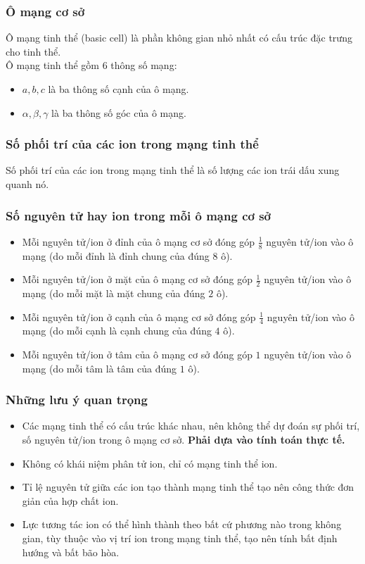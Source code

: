 \subsubsection{Ô mạng cơ sở}
Ô mạng tinh thể (basic cell) là phần không gian nhỏ nhất có cấu trúc đặc trưng cho tinh thể.\\
Ô mạng tinh thể gồm $6$ thông số mạng:
\begin{itemize}
\item $a, b, c$ là ba thông số cạnh của ô mạng.
\item $\alpha, \beta, \gamma$ là ba thông số góc của ô mạng.
\end{itemize}
\subsubsection{Số phối trí của các ion trong mạng tinh thể}
Số phối trí của các ion trong mạng tinh thể là số lượng các ion trái dấu xung quanh nó.
\subsubsection{Số nguyên tử hay ion trong mỗi ô mạng cơ sở}
\begin{itemize}
\item Mỗi nguyên tử/ion ở đỉnh của ô mạng cơ sở đóng góp $\frac{1}{8}$ nguyên tử/ion vào ô mạng (do mỗi đỉnh là đỉnh chung của đúng $8$ ô).
\item Mỗi nguyên tử/ion ở mặt của ô mạng cơ sở đóng góp $\frac{1}{2}$ nguyên tử/ion vào ô mạng (do mỗi mặt là mặt chung của đúng $2$ ô).
\item Mỗi nguyên tử/ion ở cạnh của ô mạng cơ sở đóng góp $\frac{1}{4}$ nguyên tử/ion vào ô mạng (do mỗi cạnh là cạnh chung của đúng $4$ ô).
\item Mỗi nguyên tử/ion ở tâm của ô mạng cơ sở đóng góp $1$ nguyên tử/ion vào ô mạng (do mỗi tâm là tâm của đúng $1$ ô).
\end{itemize}
\subsubsection{Những lưu ý quan trọng}
\begin{itemize}
\item Các mạng tinh thể có cấu trúc khác nhau, nên không thể dự đoán sự phối trí, số nguyên tử/ion trong ô mạng cơ sở. \textbf{Phải dựa vào tính toán thực tế.}
\item Không có khái niệm phân tử ion, chỉ có mạng tinh thể ion.
\item Tỉ lệ nguyên tử giữa các ion tạo thành mạng tinh thể tạo nên công thức đơn giản của hợp chất ion.
\item Lực tương tác ion có thể hình thành theo bất cứ phương nào trong không gian, tùy thuộc vào vị trí ion trong mạng tinh thể, tạo nên tính bất định hướng và bất bão hòa.
\end{itemize}

